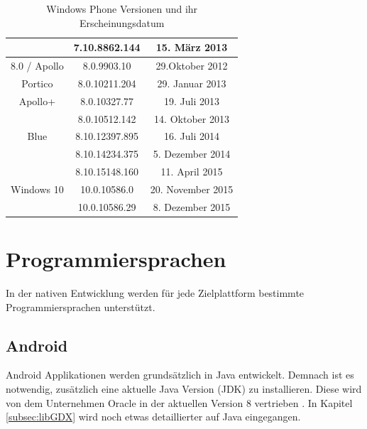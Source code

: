 \begin{table}[htbp]
{\begin{tabular}{|c|c|c|}
			& 7.10.8862.144                           & 15. März 2013                                     \\ \hline
			8.0 / Apollo                             & 8.0.9903.10                             & 29.Oktober 2012                                   \\ \hline
			Portico                                  & 8.0.10211.204                           & 29. Januar 2013                                   \\ \hline
			Apollo+                                  & 8.0.10327.77                            & 19. Juli 2013                                     \\ \hline
			& 8.0.10512.142                           & 14. Oktober 2013                                  \\ \hline
			Blue                                     & 8.10.12397.895                          & 16. Juli 2014                                     \\ \hline
			& 8.10.14234.375                          & 5. Dezember 2014                                  \\ \hline
			& 8.10.15148.160                          & 11. April 2015                                    \\ \hline
			Windows 10                               & 10.0.10586.0                            & 20. November 2015                                 \\ \hline
			& 10.0.10586.29                           & 8. Dezember 2015                                  \\ \hline
		\end{tabular}
	}
	\caption{Windows Phone Versionen und ihr Erscheinungsdatum}
	\label{tab_WP_versions}\citep{WP7_version_releases, WP8_version_releases, WP10_version_releases}
\end{table}

\section{Programmiersprachen}
In der nativen Entwicklung werden für jede Zielplattform bestimmte Programmiersprachen unterstützt. 

\subsection{Android}
Android Applikationen werden grundsätzlich in Java entwickelt. Demnach ist es notwendig, zusätzlich eine aktuelle Java Version (JDK) zu installieren. Diese wird von dem Unternehmen Oracle in der aktuellen Version 8  vertrieben \citep{java_jdk}. In Kapitel \ref{subsec:libGDX} wird noch etwas detaillierter auf Java eingegangen. 


